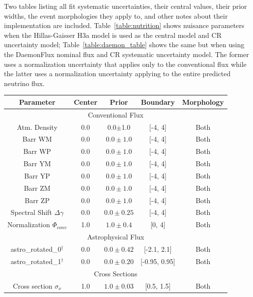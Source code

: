 \documentclass[main.tex]{subfiles}
\begin{document}
Two tables listing all fit systematic uncertainties, their central values, their prior widths, the event morphologies they apply to, and other notes about their implementation are included. Table~\ref{table:nutrition} shows nuisance parameters when the Hillas-Gaisser H3a model is used as the central model and CR uncertainty model; Table~\ref{table:daemon_table} shows the same but when using the DaemonFlux nominal flux and CR systematic uncertainty model. 
The former uses a normalization uncertainty that applies only to the conventional flux while the latter uses a normalization uncertainty applying to the entire predicted neutrino flux.

\begin{table}
    \centering
    \begin{tabular}{c | cccc}\rowcolor{blue!25}
        {\large \textbf{Parameter}} & {\large \textbf{Center}} & {\large \textbf{Prior}} & {\large \textbf{Boundary}}& {\large \textbf{Morphology}} \\ \hline
        \multicolumn{5}{c}{Conventional Flux} \\\hline
        Atm. Density & 0.0 & 0.0$\pm$1.0 & [-4, 4] & Both \\
        Barr WM  & 0.0 & $0.0\pm1.0$ & [-4, 4]& Both  \\
        Barr WP  & 0.0 & $0.0\pm1.0$ & [-4, 4]& Both  \\
        Barr YM  & 0.0 & $0.0\pm1.0$ & [-4, 4]& Both  \\
        Barr YP  & 0.0 & $0.0\pm1.0$ & [-4, 4]& Both  \\
        Barr ZM  & 0.0 & $0.0\pm1.0$ & [-4, 4]& Both  \\
        Barr ZP  & 0.0 & $0.0\pm1.0$ & [-4, 4]& Both  \\
        Spectral Shift $\Delta \gamma$ & 0.0 & $0.0\pm0.25$ & [-4, 4]& Both   \\
        Normalization $\Phi_{conv}$ & 1.0 & $1.0\pm0.4$ & [0, 4] & Both  \\
        \multicolumn{5}{c}{Astrophysical Flux} \\\hline
        astro\_rotated\_0$^{\dag}$ & 0.0 & $0.0\pm 0.42 $ & [-2.1, 2.1]&Both \\
        astro\_rotated\_1$^{\dag}$ & 0.0 & $0.0\pm0.20$ & [-0.95, 0.95]&Both \\
        \multicolumn{5}{c}{Cross Sections} \\\hline
        Cross section $\sigma_{\nu}$ & 1.0 & $1.0\pm0.03$ & [0.5, 1.5]& Both  \\

\end{tabular}
\end{table}
\end{document}
